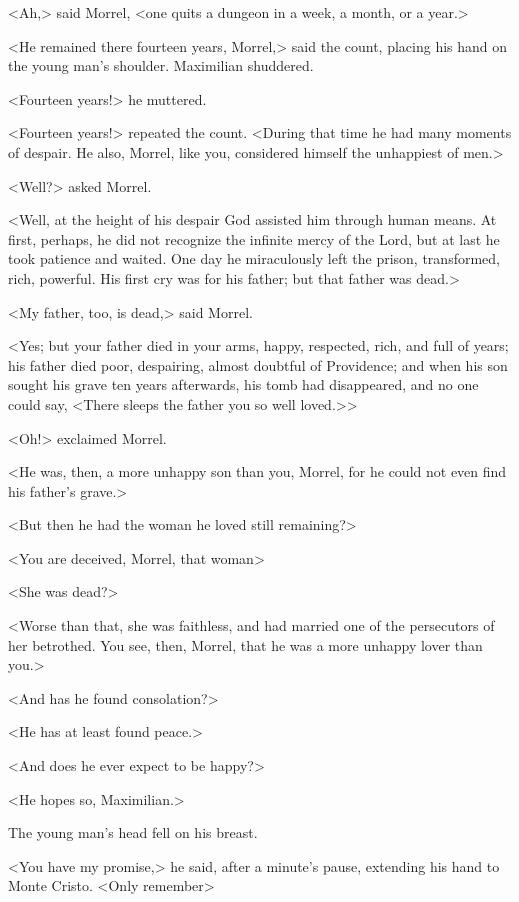  <Ah,> said Morrel, <one quits a dungeon in a week, a month, or a year.> 

 <He remained there fourteen years, Morrel,> said the count, placing his hand on the young man's shoulder. Maximilian shuddered. 

 <Fourteen years!> he muttered. 

 <Fourteen years!> repeated the count. <During that time he had many moments of despair. He also, Morrel, like you, considered himself the unhappiest of men.> 

 <Well?> asked Morrel. 

 <Well, at the height of his despair God assisted him through human means. At first, perhaps, he did not recognize the infinite mercy of the Lord, but at last he took patience and waited. One day he miraculously left the prison, transformed, rich, powerful. His first cry was for his father; but that father was dead.> 

 <My father, too, is dead,> said Morrel. 

 <Yes; but your father died in your arms, happy, respected, rich, and full of years; his father died poor, despairing, almost doubtful of Providence; and when his son sought his grave ten years afterwards, his tomb had disappeared, and no one could say, <There sleeps the father you so well loved.>> 

 <Oh!> exclaimed Morrel. 

 <He was, then, a more unhappy son than you, Morrel, for he could not even find his father's grave.> 

 <But then he had the woman he loved still remaining?> 

 <You are deceived, Morrel, that woman\longdash> 

 <She was dead?> 

 <Worse than that, she was faithless, and had married one of the persecutors of her betrothed. You see, then, Morrel, that he was a more unhappy lover than you.> 

 <And has he found consolation?> 

 <He has at least found peace.> 

 <And does he ever expect to be happy?> 

 <He hopes so, Maximilian.> 

 The young man's head fell on his breast. 

 <You have my promise,> he said, after a minute's pause, extending his hand to Monte Cristo. <Only remember\longdash> 

